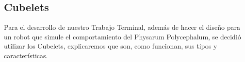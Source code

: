 \subsection{Cubelets}
\label{subsection:cubelets}

    Para el desarrollo de nuestro Trabajo Terminal, adem\'as de hacer el dise\~no para
        un robot que simule el comportamiento del Physarum Polycephalum, se decidi\'o
        utilizar los Cubelets, explicaremos que son, como funcionan, sus tipos y
        caracter\'isticas.
    \vskip 0.5cm
    
    
    